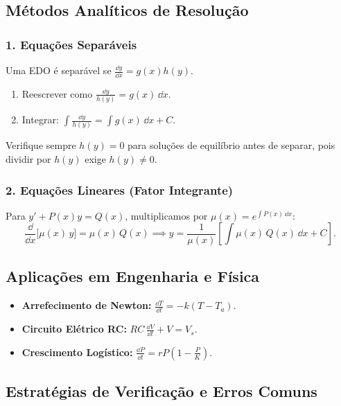 \subsection{Métodos Analíticos de Resolução}

\subsubsection*{1. Equações Separáveis}
Uma EDO é separável se $\frac{\dd y}{\dd x} = g(x)h(y)$. 
\begin{enumerate}
  \item Reescrever como $\frac{\dd y}{h(y)} = g(x)\,\dd x$.
  \item Integrar: $\int \frac{\dd y}{h(y)} = \int g(x)\,\dd x + C$.
\end{enumerate}

\begin{tipbox}
  Verifique sempre $h(y)=0$ para soluções de equilíbrio antes de separar, pois dividir por $h(y)$ exige $h(y)\neq 0$.
\end{tipbox}

\subsubsection*{2. Equações Lineares (Fator Integrante)}
\begin{thmbox}[title={Fator Integrante}]
  Para $y' + P(x)y = Q(x)$, multiplicamos por $\mu(x) = e^{\int P(x)\,\dd x}$:
  \[
    \frac{\dd}{\dd x}\!\bigl[\mu(x)\,y\bigr] = \mu(x)\,Q(x) \implies y = \frac{1}{\mu(x)}\left[\int \mu(x)\,Q(x)\,\dd x + C\right].
  \]
\end{thmbox}

\subsection{Aplicações em Engenharia e Física}
\begin{itemize}
    \item \textbf{Arrefecimento de Newton:} $\frac{\dd T}{\dd t} = -k(T - T_a)$.
    \item \textbf{Circuito Elétrico RC:} $RC\,\frac{\dd V}{\dd t} + V = V_s$.
    \item \textbf{Crescimento Logístico:} $\frac{\dd P}{\dd t} = rP\left(1-\frac{P}{K}\right)$.
\end{itemize}

\subsection{Estratégias de Verificação e Erros Comuns}

